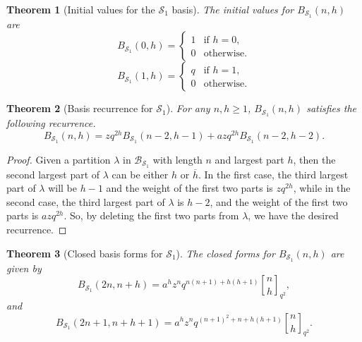 \documentclass[11pt]{amsart}
\newtheorem{theorem}{Theorem}[section]
\theoremstyle{definition}
\theoremstyle{remark}
\numberwithin{equation}{section}
\begin{document}
\begin{theorem}[Initial values for the $\mathcal S_1$ basis]\label{thm:S1-initial}
The initial values for $B_{\mathcal S_1}(n,h)$ are
\begin{equation*}
    B_{\mathcal S_1}(0,h)=\begin{cases}
        1 &  \text{if $h=0$,}\\
        0 &  \text{otherwise.}
    \end{cases}
\end{equation*}
\begin{equation*}
    B_{\mathcal S_1}(1,h)=\begin{cases}
        q &  \text{if $h=1$,}\\
        0 &  \text{otherwise.}
            \end{cases}
\end{equation*}
\end{theorem}
\begin{theorem}[Basis recurrence for $\mathcal S_1$]\label{thm:S1-recurrence}
For any $n,h\geq1$, $B_{\mathcal S_1}(n,h)$ satisfies the following recurrence.
\begin{equation}\label{eq:S1Rec}
B_{\mathcal S_1}(n,h)=zq^{2h}B_{\mathcal S_1}(n-2,h-1)+azq^{2h}B_{\mathcal S_1}(n-2,h-2).
\end{equation}
\end{theorem}

\begin{proof}
Given a partition $\lambda$ in $\mathcal{B}_{\mathcal{S}_1}$ with length $n$ and largest part $h$, then the second largest part of $\lambda$ can be either $h$ or $\overline{h}$. In the first case, the third largest part of $\lambda$ will be $h-1$ and the weight of the first two parts is $zq^{2h}$, while in the second case, the third largest part of $\lambda$ is $h-2$, and the weight of the first two parts is $azq^{2h}$. So, by deleting the first two parts from $\lambda$, we have the desired recurrence.
\end{proof}

\begin{theorem}[Closed basis forms for $\mathcal S_1$]\label{thm:S1-closed}
The closed forms for $B_{\mathcal S_1}(n,h)$ are given by
\begin{equation}\label{eq:S1B1}
B_{\mathcal S_1}(2n,n+h)=a^hz^nq^{n(n+1)+h(h+1)}{n\brack h}_{q^2},
\end{equation}
and
\begin{equation}\label{eq:S1B2}
B_{\mathcal S_1}(2n+1,n+h+1)=a^hz^nq^{(n+1)^2+n+h(h+1)}{n\brack h}_{q^2}.
\end{equation}
\end{theorem}
\end{document}
